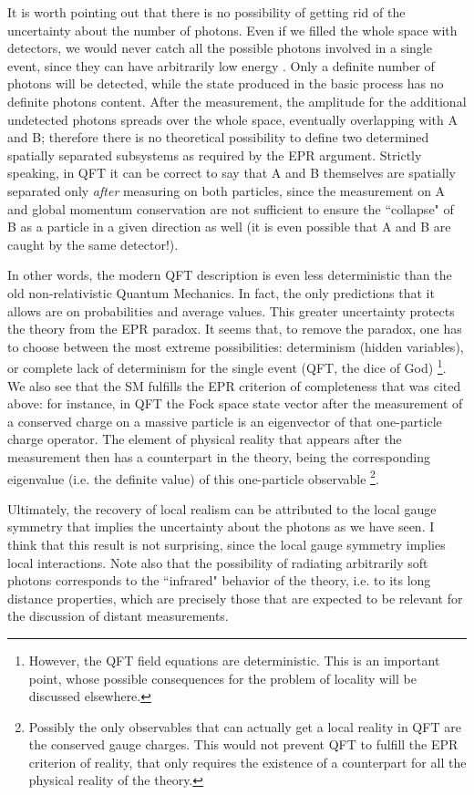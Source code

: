 \documentclass[aps,prl,showkeys,showpacs,preprint,groupedaddress]{revtex4}
\begin{document}
It is worth pointing out that there is no possibility of getting
rid of the uncertainty about the number of photons. Even if we
filled the whole space with detectors, we would never catch all
the possible photons involved in a single event, since they can
have arbitrarily low energy \cite{WeinbookI}. Only a definite
number of photons will be detected, while the state produced in
the basic process has no definite photons content. After the
measurement, the amplitude for the additional undetected photons
spreads over the whole space, eventually overlapping with A and B;
therefore there is no theoretical possibility to define two
determined spatially separated subsystems as required by the EPR
argument. Strictly speaking, in QFT it can be correct to say that
A and B themselves are spatially separated only {\it after}
measuring on both particles, since the measurement on A and global
momentum conservation are not sufficient to ensure the ``collapse"
of B as a particle in a given direction as well (it is even
possible that A and B are caught by the same detector!).

In other words, the modern QFT description is even less
deterministic than the old non-relativistic Quantum Mechanics. In
fact, the only predictions that it allows are on probabilities and
average values. This greater uncertainty protects the theory from
the EPR paradox. It seems that, to remove the paradox, one has to
choose between the most extreme possibilities: determinism (hidden
variables), or complete lack of determinism for the single event
(QFT, the dice of God) \footnote{However, the QFT field equations
are deterministic. This is an important point, whose possible
consequences for the problem of locality will be discussed
elsewhere.}. We also see that the SM fulfills the EPR criterion of
completeness that was cited above: for instance, in QFT the Fock
space state vector after the measurement of a conserved charge on
a massive particle is an eigenvector of that one-particle charge
operator. The element of physical reality that appears after the
measurement then has a counterpart in the theory, being the
corresponding eigenvalue (i.e. the definite value) of this
one-particle observable \footnote{Possibly the only observables
that can actually get a local reality in QFT are the conserved
gauge charges. This would not prevent QFT to fulfill the EPR
criterion of reality, that only requires the existence of a
counterpart for all the physical reality of the theory.}.

Ultimately, the recovery of local realism can be attributed to the
local gauge symmetry that implies the uncertainty about the
photons as we have seen. I think that this result is not
surprising, since the local gauge symmetry implies local
interactions. Note also that the possibility of radiating
arbitrarily soft photons corresponds to the ``infrared" behavior
of the theory, i.e. to its long distance properties, which are
precisely those that are expected to be relevant for the
discussion of distant measurements.
\end{document}
